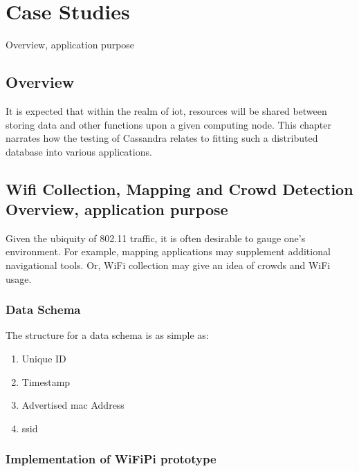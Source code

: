 \chapter{Case Studies}

\label{Case Studies}
\label{Chapter5}
                Overview, application purpose

\section{Overview}
It is expected that within the realm of \gls{iot}, resources will be shared between storing data and other functions upon a given computing node.
This chapter narrates how the testing of Cassandra relates to fitting such a distributed database into various applications.

\section{Wifi Collection, Mapping and Crowd Detection Overview, application purpose}
Given the ubiquity of 802.11 traffic, it is often desirable to gauge one's environment.
For example, mapping applications may supplement additional navigational tools.
Or, WiFi collection may give an idea of crowds and WiFi usage.

\subsection{Data Schema}
The structure for a data schema is as simple as:
\begin{enumerate}
\item Unique ID
\item Timestamp
\item Advertised \gls{mac} Address
\item \gls{ssid}
\end{enumerate}

\subsection{Implementation of WiFiPi prototype}


